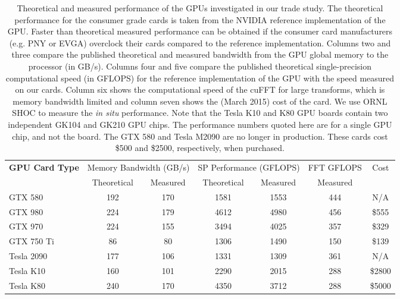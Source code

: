 \begin{table}[!b]
\centering
{\small
\begin{tabular}{|l|c|c|c|c|c|c|}
\hline 
{\bf GPU Card Type}  & \multicolumn{2}{c|}{Memory Bandwidth (GB/s)} & \multicolumn{2}{c|}{SP Performance (GFLOPS)} & FFT GFLOPS & Cost \\
                     & Theoretical & Measured & Theoretical & Measured & Measured &  \\\hline
GTX 580 & 192 & 170 & 1581 & 1553 & 444 & N/A \\
GTX 980 & 224 & 179 & 4612 & 4980 & 456 & \$555\\
GTX 970 & 224 & 155 & 3494 & 4025 & 357 & \$329 \\
GTX 750 Ti & 86 & 80 & 1306 & 1490 & 150 & \$139 \\
Tesla 2090 & 177 & 106 & 1331 & 1309 & 361 & N/A \\
Tesla K10 & 160 & 101 & 2290 & 2015 & 288 & \$2800 \\
Tesla K80 & 240 & 170 & 4350 & 3712 & 288 & \$5000 \\\hline
\end{tabular}
}
\caption{\label{tab:gpu-test-stand}
Theoretical and measured performance of the GPUs investigated in our trade
study. The theoretical performance for the consumer grade cards is
taken from the NVIDIA reference implementation of the GPU. Faster than
theoretical measured performance can be obtained if the consumer card
manufacturers (e.g.  PNY or EVGA) overclock their cards compared to the
reference implementation. Columns two and three compare the published
theoretical and measured bandwidth from the GPU global memory to the processor
(in GB/s).  Columns four and five compare the published theoretical
single-precision computational speed (in GFLOPS) for the reference
implementation of the GPU with the speed measured on our cards.  Column six
shows the computational speed of the cuFFT for large transforms, which is
memory bandwidth limited and column seven shows the (March 2015) cost of the
card. We use ORNL SHOC to measure the \emph{in situ} performance. Note that
the Tesla K10 and K80 GPU boards contain two independent GK104 and GK210 GPU
chips. The performance numbers quoted here are for a single GPU chip, and not
the board. The GTX 580 and Tesla M2090 are no longer in production. These
cards cost \$500 and \$2500, respectively, when purchased.
}
\end{table}

